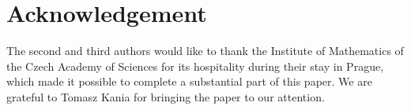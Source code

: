 \documentclass{amsart}
\theoremstyle{plain}
\theoremstyle{definition}
\theoremstyle{remark}
\numberwithin{equation}{section}
\begin{document}
\section*{Acknowledgement}\label{section Acknowledgement}
The second and third authors would like to thank the Institute of Mathematics of the Czech Academy of Sciences for its hospitality during their stay in Prague, which made it possible to complete a substantial part of this paper.
We are grateful to Tomasz Kania for bringing the paper \cite{Kakutani_Product} to our attention.






\end{document}
